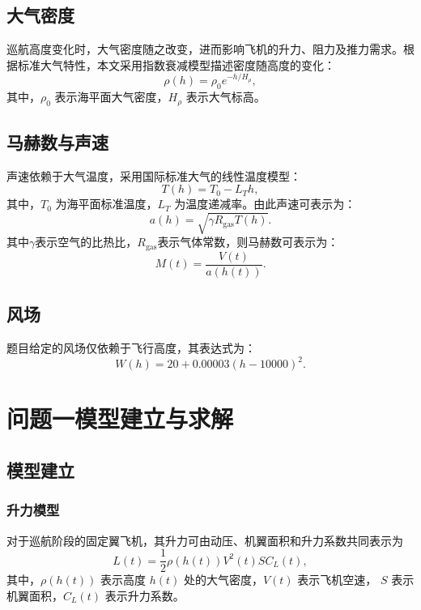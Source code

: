 \documentclass[withoutpreface,bwprint]{cumcmthesis} %
\begin{document}
\subsection{大气密度}
巡航高度变化时，大气密度随之改变，进而影响飞机的升力、阻力及推力需求。根据标准大气特性，本文采用指数衰减模型\cite{2}描述密度随高度的变化：
\begin{equation}
    \rho(h)=\rho_0 e^{-h/H_\rho} ,
\end{equation}
其中，$\rho_0$ 表示海平面大气密度，$H_\rho$ 表示大气标高。
\subsection{马赫数与声速}
声速依赖于大气温度，采用国际标准大气的线性温度模型：
\begin{equation}
    T(h)=T_0-L_T h,
    \label{eq:T_model}
\end{equation}
其中，$T_0$ 为海平面标准温度，$L_T$ 为温度递减率。由此声速可表示为：
\begin{equation}
    a(h)=\sqrt{\gamma R_{\mathrm{gas}}T(h)}.
    \label{eq:sound_speed_model}
\end{equation}
其中$\gamma$表示空气的比热比，$R_{\mathrm{gas}}$表示气体常数，则马赫数可表示为：
\begin{equation}
    M(t)=\frac{V(t)}{a(h(t))}.
    \label{eq:mach_model}
\end{equation}
\subsection{风场}
题目给定的风场仅依赖于飞行高度，其表达式为：
\begin{equation}
    W(h)=20+0.00003(h-10000)^2.
    \label{eq:wind_model}
\end{equation}

\section{问题一模型建立与求解}
\subsection{模型建立}
\subsubsection{升力模型}

对于巡航阶段的固定翼飞机，其升力可由动压、机翼面积和升力系数共同表示为\cite{5}
\begin{equation}
    L(t)=\frac{1}{2}\rho(h(t))V^2(t)S C_L(t),
    \label{eq:lift}
\end{equation}
其中，$\rho(h(t))$ 表示高度 $h(t)$ 处的大气密度，$V(t)$ 表示飞机空速，
$S$ 表示机翼面积，$C_L(t)$ 表示升力系数。
\end{document}
